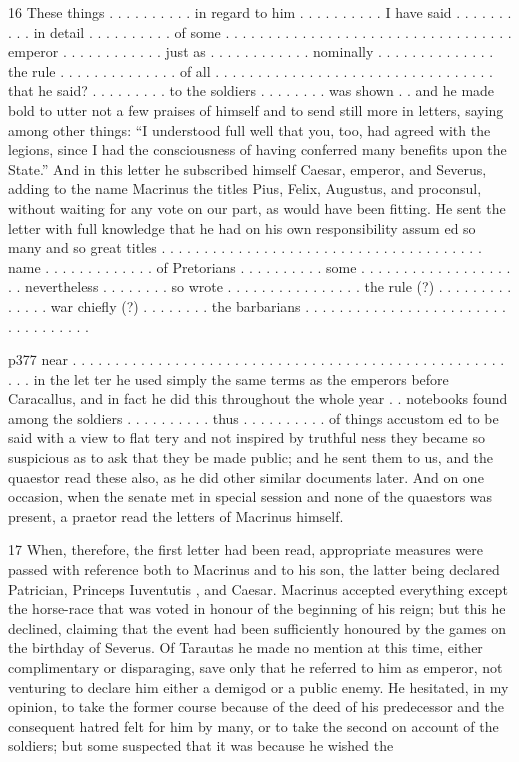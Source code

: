 16
These things . . . . . . . . . . in regard to him . . . . . . . . . . I have said . . . . . . . . . . in detail . . . . . . . . . . of some . . . . . . . . . . . . . . . . . . . . . . . . . . . . . . . . . . emperor . . . . . . . . . . . . just as . . . . . . . . . . . . nominally . . . . . . . . . . . . . . the rule . . . . . . . . . . . . . . of all . . . . . . . . . . . . . . . . . . . . . . . . . . . . . . . . . that he said? . . . . . . . . . to the soldiers . . . . . . . . was shown . . and he made bold to utter not a few praises of himself and to send still more in letters, saying among other things: ``I understood full well that you, too, had agreed with the legions, since I had the consciousness of having conferred many benefits upon the State.'' And in this letter he subscribed himself Caesar, emperor, and Severus, adding to the name Macrinus the titles Pius, Felix, Augustus, and proconsul, without waiting for any vote on our part, as would have been fitting. He sent the letter with full knowledge that he had on his own responsibility assum ed so many and so great titles . . . . . . . . . . . . . . . . . . . . . . . . . . . . . . . . . . . . . . name . . . . . . . . . . . . . of Pretorians . . . . . . . . . . some . . . . . . . . . . . . . . . . . . . . nevertheless . . . . . . . . so wrote . . . . . . . . . . . . . . . . the rule (?) . . . . . . . . . . . . . . war chiefly (?) . . . . . . . . the barbarians . . . . . . . . . . . . . . . . . . . . . . . . . . . . . . . . . .

p377 near . . . . . . . . . . . . . . . . . . . . . . . . . . . . . . . . . . . . . . . . . . . . . . . . . . . . . . in the let ter he used simply the same terms as the emperors before Caracallus, and in fact he did this throughout the whole year . . notebooks found among the soldiers . . . . . . . . . . thus . . . . . . . . . . of things accustom ed to be said with a view to flat tery and not inspired by truthful ness they became so suspicious as to ask that they be made public; and he sent them to us, and the quaestor read these also, as he did other similar documents later. And on one occasion, when the senate met in special session and none of the quaestors was present, a praetor read the letters of Macrinus himself.

17
When, therefore, the first letter had been read, appropriate measures were passed with reference both to Macrinus and to his son, the latter being declared Patrician, Princeps Iuventutis , and Caesar. Macrinus accepted everything except the horse-race that was voted in honour of the beginning of his reign; but this he declined, claiming that the event had been sufficiently honoured by the games on the birthday of Severus. Of Tarautas he made no mention at this time, either complimentary or disparaging, save only that he referred to him as emperor, not venturing to declare him either a demigod or a public enemy. He hesitated, in my opinion, to take the former course because of the deed of his predecessor and the consequent hatred felt for him by many, or to take the second on account of the soldiers; but some suspected that it was because he wished the

